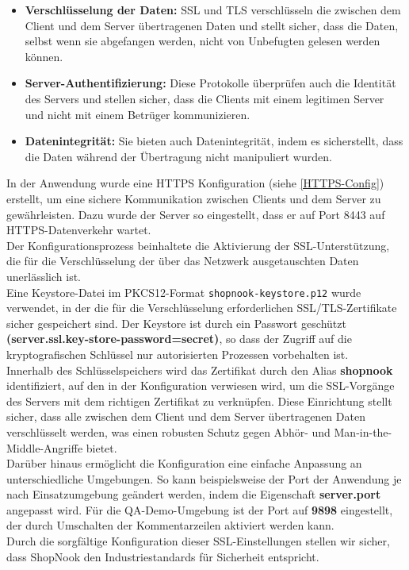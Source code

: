 \begin{itemize}
	\item \textbf{Verschlüsselung der Daten:} SSL und TLS verschlüsseln die zwischen dem Client und dem Server übertragenen Daten und stellt sicher, dass die Daten, selbst wenn sie abgefangen werden, nicht von Unbefugten gelesen werden können.
	\item \textbf{Server-Authentifizierung:} Diese Protokolle überprüfen auch die Identität des Servers und stellen sicher, dass die Clients mit einem legitimen Server und nicht mit einem Betrüger kommunizieren.
	\item \textbf{Datenintegrität:} Sie bieten auch Datenintegrität, indem es sicherstellt, dass die Daten während der Übertragung nicht manipuliert wurden.
\end{itemize}
In der Anwendung wurde eine HTTPS Konfiguration (siehe \ref{HTTPS-Config}) erstellt, um eine sichere Kommunikation zwischen Clients und dem Server zu gewährleisten. Dazu wurde der Server so eingestellt, dass er auf Port 8443 auf HTTPS-Datenverkehr wartet.\\
Der Konfigurationsprozess beinhaltete die Aktivierung der SSL-Unterstützung, die für die Verschlüsselung der über das Netzwerk ausgetauschten Daten unerlässlich ist.\\
Eine Keystore-Datei im PKCS12-Format \verb*|shopnook-keystore.p12| wurde verwendet, in der die für die Verschlüsselung erforderlichen SSL/TLS-Zertifikate sicher gespeichert sind. Der Keystore ist durch ein Passwort geschützt \textbf{(server.ssl.key-store-password=secret)}, so dass der Zugriff auf die kryptografischen Schlüssel nur autorisierten Prozessen vorbehalten ist. \\ 
Innerhalb des Schlüsselspeichers wird das Zertifikat durch den Alias \textbf{shopnook} identifiziert, auf den in der Konfiguration verwiesen wird, um die SSL-Vorgänge des Servers mit dem richtigen Zertifikat zu verknüpfen. Diese Einrichtung stellt sicher, dass alle zwischen dem Client und dem Server übertragenen Daten verschlüsselt werden, was einen robusten Schutz gegen Abhör- und Man-in-the-Middle-Angriffe bietet.\\
Darüber hinaus ermöglicht die Konfiguration eine einfache Anpassung an unterschiedliche Umgebungen. So kann beispielsweise der Port der Anwendung je nach Einsatzumgebung geändert werden, indem die Eigenschaft \textbf{server.port} angepasst wird. Für die QA-Demo-Umgebung ist der Port auf \textbf{9898} eingestellt, der durch Umschalten der Kommentarzeilen aktiviert werden kann.\\
Durch die sorgfältige Konfiguration dieser SSL-Einstellungen stellen wir sicher, dass ShopNook den Industriestandards für Sicherheit entspricht.\newpage

